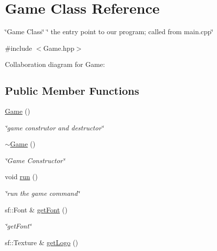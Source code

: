 \hypertarget{classGame}{}\section{Game Class Reference}
\label{classGame}


\char`\"{}\+Game Class\char`\"{}  \char`\"{} the entry point to our program; called from main.\+cpp\char`\"{}  




{\ttfamily \#include $<$Game.\+hpp$>$}



Collaboration diagram for Game\+:
\subsection*{Public Member Functions}
\begin{DoxyCompactItemize}
\item 
\mbox{\label{classGame_ad59df6562a58a614fda24622d3715b65}} 
\hyperlink{classGame_ad59df6562a58a614fda24622d3715b65}{Game} ()
\begin{DoxyCompactList}\small\item\em \char`\"{}game construtor and destructor\char`\"{} \end{DoxyCompactList}\item 
\mbox{\label{classGame_ae3d112ca6e0e55150d2fdbc704474530}} 
\hyperlink{classGame_ae3d112ca6e0e55150d2fdbc704474530}{$\sim$\+Game} ()
\begin{DoxyCompactList}\small\item\em \char`\"{}\+Game Constructor\char`\"{} \end{DoxyCompactList}\item 
void \hyperlink{classGame_a1ab78f5ed0d5ea879157357cf2fb2afa}{run} ()
\begin{DoxyCompactList}\small\item\em \char`\"{}run the game command\char`\"{} \end{DoxyCompactList}\item 
sf\+::\+Font \& \hyperlink{classGame_a813ff20fa498389e4bb120090803676b}{get\+Font} ()
\begin{DoxyCompactList}\small\item\em \char`\"{}get\+Font\char`\"{} \end{DoxyCompactList}\item 
sf\+::\+Texture \& \hyperlink{classGame_a4eb607b287a0aa0238339454399edc8b}{get\+Logo} ()

\end{DoxyCompactItemize}
